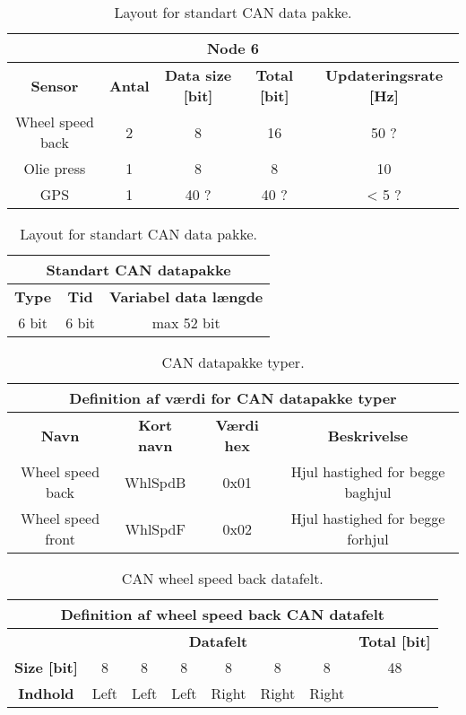 \begin{table}[H] \centering
	\begin{tabular}{|c|c|c|c|c|}
        \hline \multicolumn{5}{|c|}{\textbf{Node 6}} \\
	    \hline \hline \textbf{Sensor} & \textbf{Antal} & \textbf{Data size [bit]} & \textbf{Total [bit]} & \textbf{Updateringsrate [Hz]}\\
        \hline Wheel speed back & 2 &  8 & 16 & 50 ?\\
        \hline Olie press & 1 &  8 & 8 & 10\\
        \hline GPS & 1 &  40 ? & 40 ? & < 5 ?\\
        \hline
    \end{tabular}
\caption{Layout for standart CAN data pakke.}
\label{table:std_can_pakke}
\end{table}

\begin{table}[H] \centering
	\begin{tabular}{|c|c|c|}
        \hline \multicolumn{3}{|c|}{\textbf{Standart CAN datapakke}} \\
	    \hline \hline \textbf{Type} & \textbf{Tid}& \textbf{Variabel data længde}\\
        \hline 6 bit & 6 bit & max 52 bit \\ 
        \hline
    \end{tabular}
\caption{Layout for standart CAN data pakke.}
\label{table:std_can_pakke}
\end{table}

\begin{table}[H] \centering
	\begin{tabular}{|c|c|c|c|}
        \hline \multicolumn{4}{|c|}{\textbf{Definition af værdi for CAN datapakke typer}} \\
	    \hline \hline \textbf{Navn} & \textbf{Kort navn} & \textbf{Værdi hex}& \textbf{Beskrivelse}\\
        \hline Wheel speed back & WhlSpdB & 0x01 & Hjul hastighed for begge baghjul\\
        \hline Wheel speed front & WhlSpdF & 0x02 & Hjul hastighed for begge forhjul\\
        \hline
    \end{tabular}
\caption{CAN datapakke typer.}
\label{table:CAN_data_typer}
\end{table}

\begin{table}[H] \centering
	\begin{tabular}{|c||c|c|c|c|c|c|c|}
        \hline \multicolumn{8}{|c|}{\textbf{Definition af wheel speed back CAN datafelt}} \\
	    \hline \hline & \multicolumn{6}{|c|}{\textbf{Datafelt}} & \textbf{Total [bit]}\\ 
        \hline \textbf{Size [bit]} & 8 & 8 & 8 & 8 & 8 & 8 & 48 \\
        \hline \textbf{Indhold} & Left & Left & Left & Right & Right & Right & \\
        \hline
    \end{tabular}
\caption{CAN wheel speed back datafelt.}
\label{table:CAN_WhlSpdB_pakke}
\end{table}

